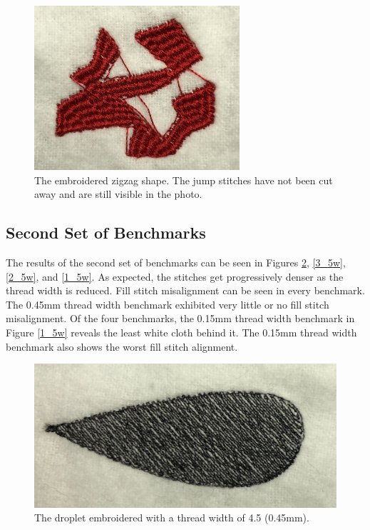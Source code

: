 \documentclass{article}
\begin{document}
\begin{figure}[H]
    \centering
    \includegraphics[width=3in]{zigzag}
    \caption{The embroidered zigzag shape. The jump stitches have not been cut away and are still visible in the photo.}
    \label{zigzag}
\end{figure}

\subsection{Second Set of Benchmarks}

The results of the second set of benchmarks can be seen in Figures \ref{4_5w}, \ref{3_5w}, \ref{2_5w}, and \ref{1_5w}. As expected, the stitches get progressively denser as the thread width is reduced. Fill stitch misalignment can be seen in every benchmark. The 0.45mm thread width benchmark exhibited very little or no fill stitch misalignment. Of the four benchmarks, the 0.15mm thread width benchmark in Figure \ref{1_5w} reveals the least white cloth behind it. The 0.15mm thread width benchmark also shows the worst fill stitch alignment.

\begin{figure}[H]
    \centering
    \includegraphics[width=4.7in]{4_5w}
    \caption{The droplet embroidered with a thread width of 4.5 (0.45mm).}
    \label{4_5w}
\end{figure}
\end{document}
